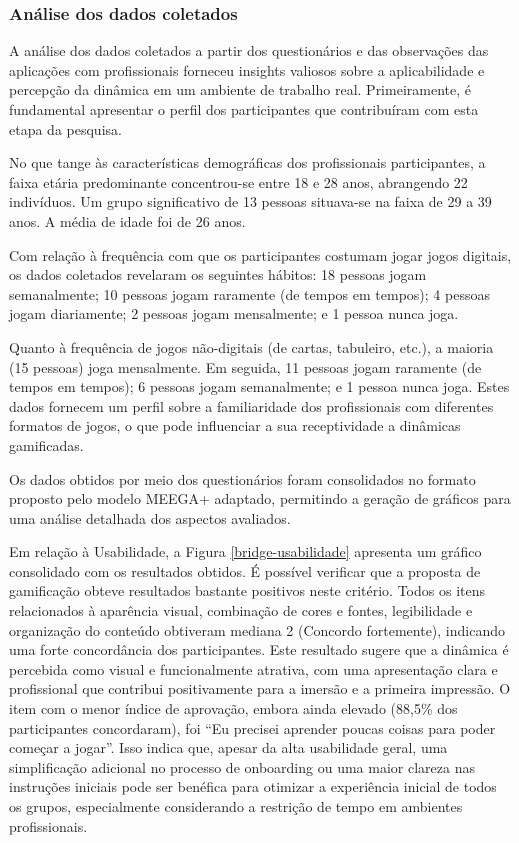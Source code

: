 \documentclass[
	12pt,
	openright,
	twoside,
	a4paper,
	english,
	brazil
	]{abntex2}
\begin{document}
\subsubsection{Análise dos dados coletados}

A análise dos dados coletados a partir dos questionários e das observações das aplicações com profissionais forneceu insights valiosos sobre a aplicabilidade e percepção da dinâmica em um ambiente de trabalho real. Primeiramente, é fundamental apresentar o perfil dos participantes que contribuíram com esta etapa da pesquisa.

No que tange às características demográficas dos profissionais participantes, a faixa etária predominante concentrou-se entre 18 e 28 anos, abrangendo 22 indivíduos. Um grupo significativo de 13 pessoas situava-se na faixa de 29 a 39 anos. A média de idade foi de 26 anos.

Com relação à frequência com que os participantes costumam jogar jogos digitais, os dados coletados revelaram os seguintes hábitos: 18 pessoas jogam semanalmente; 10 pessoas jogam raramente (de tempos em tempos); 4 pessoas jogam diariamente; 2 pessoas jogam mensalmente; e 1 pessoa nunca joga.

Quanto à frequência de jogos não-digitais (de cartas, tabuleiro, etc.), a maioria (15 pessoas) joga mensalmente. Em seguida, 11 pessoas jogam raramente (de tempos em tempos); 6 pessoas jogam semanalmente; e 1 pessoa nunca joga. Estes dados fornecem um perfil sobre a familiaridade dos profissionais com diferentes formatos de jogos, o que pode influenciar a sua receptividade a dinâmicas gamificadas.

Os dados obtidos por meio dos questionários foram consolidados no formato proposto pelo modelo MEEGA+ adaptado, permitindo a geração de gráficos para uma análise detalhada dos aspectos avaliados.


Em relação à Usabilidade, a Figura \ref{bridge-usabilidade} apresenta um gráfico consolidado com os resultados obtidos. É possível verificar que a proposta de gamificação obteve resultados bastante positivos neste critério. Todos os itens relacionados à aparência visual, combinação de cores e fontes, legibilidade e organização do conteúdo obtiveram mediana 2 (Concordo fortemente), indicando uma forte concordância dos participantes. Este resultado sugere que a dinâmica é percebida como visual e funcionalmente atrativa, com uma apresentação clara e profissional que contribui positivamente para a imersão e a primeira impressão. O item com o menor índice de aprovação, embora ainda elevado (88,5\% dos participantes concordaram), foi  “Eu precisei aprender poucas coisas para poder começar a jogar”. Isso indica que, apesar da alta usabilidade geral, uma simplificação adicional no processo de onboarding ou uma maior clareza nas instruções iniciais pode ser benéfica para otimizar a experiência inicial de todos os grupos, especialmente considerando a restrição de tempo em ambientes profissionais.
\end{document}
